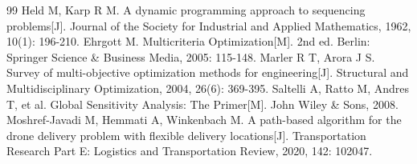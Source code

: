 \documentclass[withoutpreface,bwprint]{format}
\begin{document}
\begin{thebibliography}{99}
 Held M, Karp R M. A dynamic programming approach to sequencing problems[J]. Journal of the Society for Industrial and Applied Mathematics, 1962, 10(1): 196-210.
 Ehrgott M. Multicriteria Optimization[M]. 2nd ed. Berlin: Springer Science \& Business Media, 2005: 115-148.
 Marler R T, Arora J S. Survey of multi-objective optimization methods for engineering[J]. Structural and Multidisciplinary Optimization, 2004, 26(6): 369-395.
 Saltelli A, Ratto M, Andres T, et al. Global Sensitivity Analysis: The Primer[M]. John Wiley \& Sons, 2008.
 Moshref-Javadi M, Hemmati A, Winkenbach M. A path-based algorithm for the drone delivery problem with flexible delivery locations[J]. Transportation Research Part E: Logistics and Transportation Review, 2020, 142: 102047.
\end{thebibliography}
\end{document}
